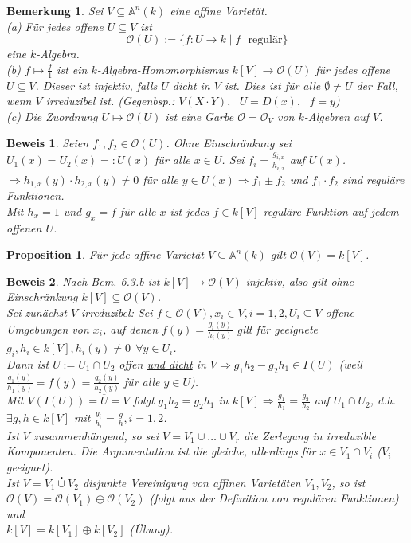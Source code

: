 \documentclass[a4paper,12pt]{report}
\theoremstyle{break}
\newtheorem{Bem}[Def]{Bemerkung}
\newtheorem{Prop}[Def]{Proposition}
\theoremstyle{nonumberbreak}
\theoremstyle{nonumberplain}
\newtheorem{Bew}{Beweis}
\begin{document}
\begin{Bem}
Sei $V\subseteq \mathbb{A}^n(k)$ eine affine Varietät.\\
(a) Für jedes offene $U\subseteq V$ ist
$$\mathcal{O}(U):= \{f: U \rightarrow k \mid f \textrm{~~regulär}\}$$
eine $k$-Algebra.\\
(b) $f\mapsto \frac{f}{1}$ ist ein $k$-Algebra-Homomorphismus $k[V]\rightarrow \mathcal{O}(U)$ für jedes offene $U\subseteq V$. Dieser ist injektiv, falls $U$ dicht in $V$ ist. Dies ist für alle $\emptyset\neq U$ der Fall, wenn $V$ irreduzibel ist. (Gegenbsp.: $V(X\cdot Y), ~~~U=D(x), ~~~f=y$)\\
(c) Die Zuordnung $U\mapsto \mathcal{O}(U)$ ist eine Garbe $\mathcal{O}=\mathcal{O}_V$ von $k$-Algebren auf $V$.
\end{Bem}
\begin{Bew}
Seien $f_1,f_2\in\mathcal{O}(U)$. Ohne Einschränkung sei $U_1(x)=U_2(x)=:U(x)$ für alle $x\in U$.
Sei $f_i=\frac{g_{i,x}}{h_{i,x}}$ auf $U(x)$.\\
$\Rightarrow h_{1,x}(y)\cdot h_{2,x}(y)\neq 0$ für alle $y\in U(x) \Rightarrow f_1\pm f_2$ und $f_1\cdot f_2$ sind reguläre Funktionen.\\
Mit $h_x=1$ und $g_x=f$ für alle $x$ ist jedes $f\in k[V]$ reguläre Funktion auf jedem offenen $U$.
\end{Bew}
\begin{Prop}
Für jede affine Varietät $V\subseteq\mathbb{A}^n(k)$ gilt $\mathcal{O}(V)=k[V]$.
\end{Prop}
\begin{Bew} Nach Bem. 6.3.b ist $k[V] \rightarrow \mathcal{O}(V)$ injektiv, also gilt ohne Einschränkung $k[V]\subseteq \mathcal{O}(V)$.\\
Sei zunächst $V$ irreduzibel: Sei $f\in \mathcal{O}(V), x_i\in V, i=1,2, U_i\subseteq V$ offene Umgebungen von $x_i$, auf denen $f(y)=\frac{g_i(y)}{h_i(y)}$ gilt für geeignete $g_i,h_i\in k[V], h_i(y)\neq 0 ~~\forall y\in U_i$.\\
Dann ist $U:=U_1\cap U_2$ offen \underline{und dicht} in $V \Rightarrow g_1h_2-g_2h_1\in I(U)$ (weil $\frac{g_1(y)}{h_1(y)}=f(y)=\frac{g_2(y)}{h_2(y)}$ für alle $y\in U$).\\
Mit $V(I(U))=\overline{U}=V$ folgt $g_1h_2=g_2h_1$ in $k[V]\Rightarrow \frac{g_1}{h_1}=\frac{g_2}{h_2}$ auf $U_1\cap U_2$, d.h. $\exists g,h\in k[V]$ mit $\frac{g_i}{h_i}=\frac{g}{h}, i=1,2$.\\
Ist $V$ zusammenhängend, so sei $V=V_1\cup \dots \cup V_r$ die Zerlegung in irreduzible Komponenten. Die Argumentation ist die gleiche, allerdings für $x\in V_1\cap V_i$ ($V_i$ geeignet).\\
Ist  $V=V_1\stackrel{\centerdot}{\cup} V_2$ disjunkte Vereinigung von affinen Varietäten $V_1,V_2$, so ist\\
$\mathcal{O}(V)=\mathcal{O}(V_1)\oplus\mathcal{O}(V_2)$ (folgt aus der Definition von regulären Funktionen) und\\
$k[V]=k[V_1]\oplus k[V_2]$ (Übung).
\end{Bew}
\end{document}
